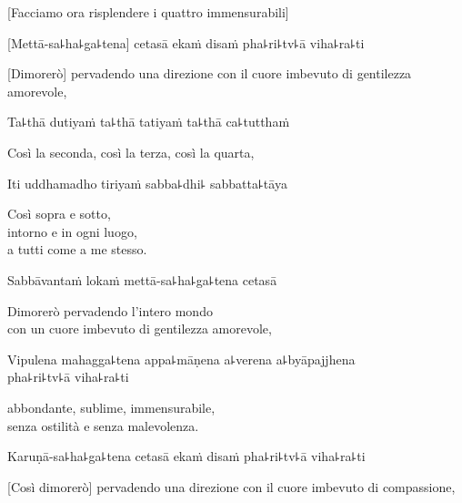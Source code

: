 \begin{leader}
\end{leader}

\begin{english}
  [Facciamo ora risplendere i quattro immensurabili]
\end{english}

[Mettā-sa꜕ha꜕ga꜕tena] cetasā ekaṁ disaṁ pha꜕ri꜕tv꜕ā viha꜕ra꜕ti\\
  \begin{english} 
    [Dimorerò] pervadendo una direzione con il cuore imbevuto di gentilezza amorevole,
\end{english}

Ta꜕thā dutiyaṁ ta꜕thā tatiyaṁ ta꜕thā ca꜕tutthaṁ\\

\begin{english}
Così la seconda, così la terza, così la quarta,
\end{english}

Iti uddhamadho tiriyaṁ sabba꜕dhi꜕ sabbatta꜕tāya\\

\begin{english} 
  Così sopra e sotto,\\
   intorno e in ogni luogo,\\
   a tutti come a me stesso.
\end{english}

Sabbāvantaṁ lokaṁ mettā-sa꜕ha꜕ga꜕tena cetasā\\
 
\begin{english}
Dimorerò pervadendo l'intero mondo\\
 con un cuore imbevuto di gentilezza amorevole, 
  \end{english}


Vipulena mahagga꜕tena appa꜕māṇena a꜕verena a꜕byāpajjhena\\
pha꜕ri꜕tv꜕ā viha꜕ra꜕ti

  \begin{english}
abbondante, sublime, immensurabile,\\
senza ostilità e senza malevolenza.
  \end{english}

Karuṇā-sa꜕ha꜕ga꜕tena cetasā ekaṁ disaṁ pha꜕ri꜕tv꜕ā viha꜕ra꜕ti\\

\begin{english}
[Così dimorerò] pervadendo una direzione con il cuore imbevuto di compassione,
  \end{english}


